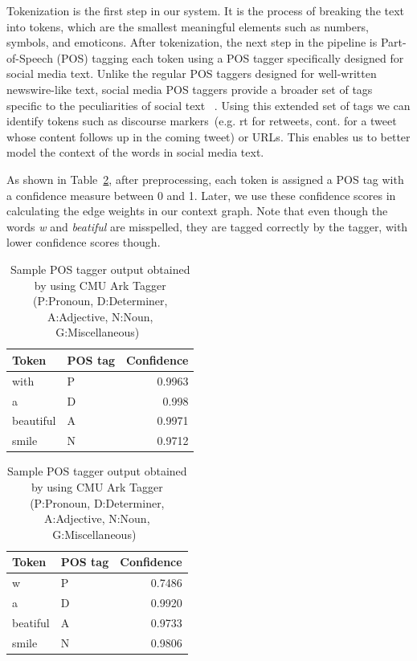 \documentclass[preprint,review,12pt]{elsarticle}
\begin{document}
Tokenization is the first step in our system. It is the process of breaking the text into tokens, which are the smallest meaningful elements such as numbers, symbols, and emoticons. After tokenization, the next step in the pipeline is Part-of-Speech (POS) tagging each token using a POS tagger specifically designed for social media text. Unlike the regular POS taggers designed for well-written newswire-like text, social media POS taggers provide a broader set of tags specific to the peculiarities of social text ~\cite{DBLP:conf/naacl/OwoputiODGSS13,Gimpel:2011:PTT:2002736.2002747}. Using this extended set of tags we can identify tokens such as discourse markers~(e.g. rt for retweets, cont. for a tweet whose content follows up in the coming tweet) or URLs. This enables us to better model the context of the words in social media text.

As shown in Table~\ref{tab:postags}, after preprocessing, each token is assigned a POS tag with a confidence measure between 0 and 1. Later, we use these confidence scores in calculating the edge weights in our context graph. Note that even though the words \emph{w} and\emph{ beatiful} are misspelled, they are tagged correctly by the tagger, with lower confidence scores though.

\begin{table}[htbp]
\begin{minipage}{.5\linewidth}
\begin{tabular}[h]{|llr|}
 \hline
Token & POS tag & Confidence \\
 \hline
with & P & 0.9963 \\
 \hline
a & D & 0.998 \\
 \hline
beautiful & A & 0.9971 \\
 \hline
smile & N & 0.9712 \\
 \hline
\end{tabular}
\end{minipage}
\begin{minipage}{.5\linewidth}
\begin{tabular}[h]{|llr|}
 \hline
Token & POS tag & Confidence \\
 \hline
w & P & 0.7486 \\
 \hline
a & D & 0.9920 \\
 \hline
beatiful & A & 0.9733 \\
 \hline
smile & N & 0.9806 \\
 \hline
\end{tabular}
\end{minipage}
\caption{Sample POS tagger output obtained by using CMU Ark Tagger (P:Pronoun, D:Determiner, A:Adjective, N:Noun, G:Miscellaneous)~\cite{DBLP:conf/naacl/OwoputiODGSS13,Gimpel:2011:PTT:2002736.2002747}}
\label{tab:postags}
\end{table}
\end{document}

